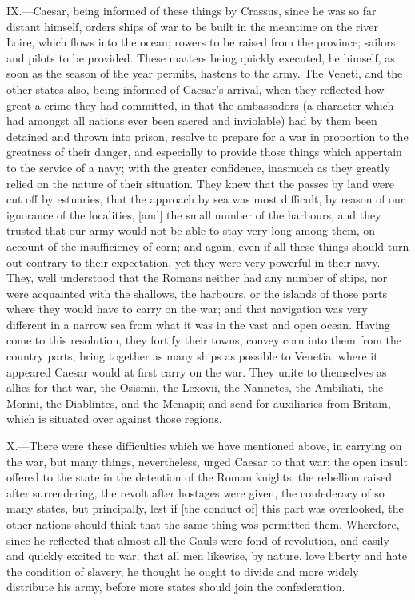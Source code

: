IX.—Caesar, being informed of these things by Crassus, since he was so
far distant himself, orders ships of war to be built in the meantime on
the river Loire, which flows into the ocean; rowers to be raised from
the province; sailors and pilots to be provided. These matters being
quickly executed, he himself, as soon as the season of the year permits,
hastens to the army. The Veneti, and the other states also, being
informed of Caesar's arrival, when they reflected how great a crime they
had committed, in that the ambassadors (a character which had amongst
all nations ever been sacred and inviolable) had by them been detained
and thrown into prison, resolve to prepare for a war in proportion to
the greatness of their danger, and especially to provide those things
which appertain to the service of a navy; with the greater confidence,
inasmuch as they greatly relied on the nature of their situation. They
knew that the passes by land were cut off by estuaries, that the
approach by sea was most difficult, by reason of our ignorance of the
localities, [and] the small number of the harbours, and they trusted
that our army would not be able to stay very long among them, on account
of the insufficiency of corn; and again, even if all these things should
turn out contrary to their expectation, yet they were very powerful in
their navy. They, well understood that the Romans neither had any number
of ships, nor were acquainted with the shallows, the harbours, or the
islands of those parts where they would have to carry on the war; and
that navigation was very different in a narrow sea from what it was in
the vast and open ocean. Having come to this resolution, they fortify
their towns, convey corn into them from the country parts, bring
together as many ships as possible to Venetia, where it appeared Caesar
would at first carry on the war. They unite to themselves as allies for
that war, the Osismii, the Lexovii, the Nannetes, the Ambiliati, the
Morini, the Diablintes, and the Menapii; and send for auxiliaries from
Britain, which is situated over against those regions.

X.—There were these difficulties which we have mentioned above, in
carrying on the war, but many things, nevertheless, urged Caesar to that
war; the open insult offered to the state in the detention of the Roman
knights, the rebellion raised after surrendering, the revolt after
hostages were given, the confederacy of so many states, but principally,
lest if [the conduct of] this part was overlooked, the other nations
should think that the same thing was permitted them. Wherefore, since he
reflected that almost all the Gauls were fond of revolution, and easily
and quickly excited to war; that all men likewise, by nature, love
liberty and hate the condition of slavery, he thought he ought to divide
and more widely distribute his army, before more states should join the
confederation.


